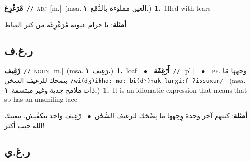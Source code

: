 \documentclass[10pt,a4paper,twoside]{article} %
\begin{document}
\begin{multicols}{2}
{\setlength\topsep{0pt}\textbf{\foreignlanguage{arabic}{مْرَغْرِغ}}\ {\color{gray}\texttt{//}\color{black}}\ \textsc{adj}\ [m.]\ \color{gray}(msa. \foreignlanguage{arabic}{العين مملوءة بالدَّمْع}~\foreignlanguage{arabic}{\textbf{١.}})\color{black}\ \textbf{1.}~filled with tears\  \begin{flushright}\color{gray}\foreignlanguage{arabic}{\textbf{\underline{\foreignlanguage{arabic}{أمثلة}}}: يا حرام عيونه مْرَغْرِغَة من كثر العياط}\end{flushright}\color{black}} \vspace{2mm}

\vspace{-3mm}
\subsection*{\color{blue}\foreignlanguage{arabic}{ر.غ.ف}\color{blue}{}} 

{\setlength\topsep{0pt}\textbf{\foreignlanguage{arabic}{رْغِيف}}\ {\color{gray}\texttt{//}\color{black}}\ \textsc{noun}\ [m.]\ \color{gray}(msa. \foreignlanguage{arabic}{رَغِيف}~\foreignlanguage{arabic}{\textbf{١.}})\color{black}\ \textbf{1.}~loaf\ \ $\bullet$\ \ \setlength\topsep{0pt}\textbf{\foreignlanguage{arabic}{أَرْغِفَة}}\ {\color{gray}\texttt{//}\color{black}}\ [pl.]\ \ $\bullet$\ \ \textsc{ph.} \color{gray} \foreignlanguage{arabic}{وجههَا مَا بضحك للرغيف السخن}\color{black}\ {\color{gray}\texttt{/{\sffamily wi(dʒ)ihhaː maː bi(dˤ)ħak larɣiːf ʔissuxun}/}\color{black}}\ \color{gray} (msa. \foreignlanguage{arabic}{ذات ملامح جدية وغير مبتسمة}~\foreignlanguage{arabic}{\textbf{١.}})\color{black}\ \textbf{1.}~It is an idiomatic expression that means that sb has an unsmiling face\  \begin{flushright}\color{gray}\foreignlanguage{arabic}{\textbf{\underline{\foreignlanguage{arabic}{أمثلة}}}: كنتهم آخر وحدة وِجِهها ما بِضْحَك للرغيف السُّخُن\ $\bullet$\ \  رْغِيف واحد بيكفِّيش. بيعينك الله جيب أكثر!}\end{flushright}\color{black}} \vspace{2mm}

\vspace{-3mm}
\subsection*{\color{blue}\foreignlanguage{arabic}{ر.غ.ي}\color{blue}{}} 


\end{multicols}
\end{document}
